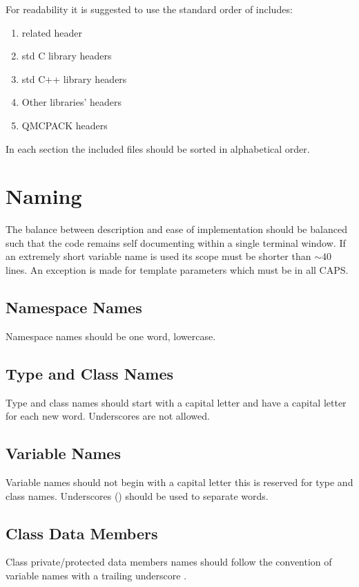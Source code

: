 For readability it is suggested to use the standard order of includes:
\begin{enumerate}
	\item related header
	\item std C library headers
	\item std C++ library headers
	\item Other libraries' headers
	\item QMCPACK headers
\end{enumerate}

In each section the included files should be sorted in alphabetical order.

\section{Naming}
The balance between description and ease of implementation should be balanced such that the code remains self documenting within a single terminal window.  If an extremely short variable name is used its scope must be shorter than $\sim 40$ lines. An exception is made for template parameters which must be in all CAPS.

\subsection{Namespace Names}
Namespace names should be one word, lowercase.

\subsection{Type and Class Names}
Type and class names should start with a capital letter and have a capital letter for each new word.
Underscores \inlinecode{_} are not allowed. 

\subsection{Variable Names}
Variable names should not begin with a capital letter this is reserved for type and class names. Underscores (\inlinecode{_}) should be used to separate words.

\subsection{Class Data Members}
Class private/protected data members names should follow the convention of variable names with a trailing underscore \inlinecode{_}.

